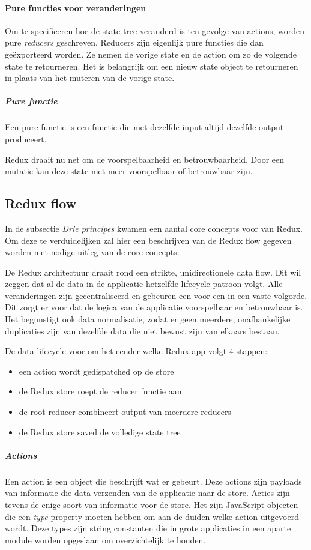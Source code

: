 \paragraph{Pure functies voor veranderingen}
Om te specificeren hoe de state tree veranderd is ten gevolge van actions, worden pure \textit{reducers} geschreven. Reducers zijn eigenlijk pure functies die dan geëxporteerd worden. Ze nemen de vorige state en de action om zo de volgende state te retourneren. Het is belangrijk om een nieuw state object te retourneren in plaats van het muteren van de vorige state. 

\subparagraph{Pure functie}
Een pure functie is een functie die met dezelfde input altijd dezelfde output produceert.

Redux draait nu net om de voorspelbaarheid en betrouwbaarheid. Door een mutatie kan deze state niet meer voorspelbaar of betrouwbaar zijn. 

\subsection{Redux flow}
In de subsectie \textit{Drie principes} kwamen een aantal core concepts voor van Redux. Om deze te verduidelijken zal hier een beschrijven van de Redux flow gegeven worden met nodige uitleg van de core concepts. 

De Redux architectuur draait rond een strikte, unidirectionele data flow. Dit wil zeggen dat al de data in de applicatie hetzelfde lifecycle patroon volgt. Alle veranderingen zijn gecentraliseerd en gebeuren een voor een in een vaste volgorde. Dit zorgt er voor dat de logica van de applicatie voorspelbaar en betrouwbaar is. Het begunstigt ook data normalisatie, zodat er geen meerdere, onafhankelijke duplicaties zijn van dezelfde data die niet bewust zijn van elkaars bestaan. 

De data lifecycle voor om het eender welke Redux app volgt 4 stappen:

\begin{itemize}
	\item een action wordt gedispatched op de store
	\item de Redux store roept de reducer functie aan
	\item de root reducer combineert output van meerdere reducers
	\item de Redux store saved de volledige state tree
\end{itemize}

\subparagraph{Actions}
Een action is een object die beschrijft wat er gebeurt.
Deze actions zijn payloads van informatie die data verzenden van de applicatie naar de store. Acties zijn tevens de enige soort van informatie voor de store. Het zijn JavaScript objecten die een \textit{type} property moeten hebben om aan de duiden welke action uitgevoerd wordt. Deze types zijn string constanten die in grote applicaties in een aparte module worden opgeslaan om overzichtelijk te houden. 

